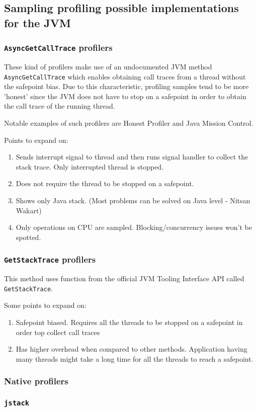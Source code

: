 \documentclass[..thesis.tex]{subfiles}
\begin{document}
\subsection{Sampling profiling possible implementations for the JVM}



\subsubsection{\texttt{AsyncGetCallTrace} profilers}
These kind of profilers make use of an undocumented JVM method \texttt{Async\-Get\-Call\-Trace} \cite{agct_source} which enables obtaining call traces from a thread without the safepoint bias. Due to this characteristic, profiling samples tend to be more 'honest' since the JVM does not have to stop on a safepoint in order to obtain the call trace of the running thread.

Notable examples of such profilers are Honest Profiler and Java Mission Control. 

Points to expand on:
\begin{enumerate}
	\item Sends interrupt signal to thread and then runs signal handler to collect the stack trace. Only interrupted thread is stopped.
	\item Does not require the thread to be stopped on a safepoint.
	\item Shows only Java stack. (Most problems can be solved on Java level - Nitsan Wakart)
	\item Only operations on CPU are sampled. Blocking/concurrency issues won't be spotted.
\end{enumerate}



\subsubsection{\texttt{GetStackTrace} profilers}
This method uses function from the official JVM Tooling Interface API \cite{jvmti_doc} called \texttt{GetStackTrace}.

Some points to expand on:
\begin{enumerate}
	\item Safepoint biased. Requires all the threads to be stopped on a safepoint in order top collect call traces
	\item Has higher overhead when compared to other methods. Application having many threads might take a long time for all the threads to reach a safepoint.
\end{enumerate}

\subsubsection{Native profilers}
\subsubsection{\texttt{jstack}}
\end{document}
